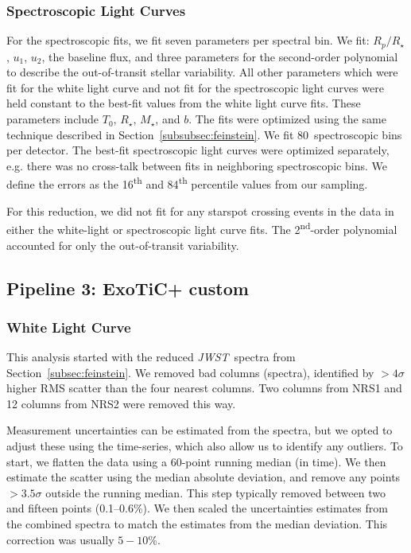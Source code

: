 \documentclass[twocolumn]{aastex63} %
\newcommand{\jwst}{\textit{JWST}}
\begin{document}
\subsubsection{Spectroscopic Light Curves}

For the spectroscopic fits, we fit seven parameters per spectral bin. We fit: $R_p/R_\star$, $u_1$, $u_2$, the baseline flux, and three parameters for the  second-order polynomial to describe the out-of-transit stellar variability. All other parameters which were fit for the white light curve and not fit for the spectroscopic light curves were held constant to the best-fit values from the white light curve fits. These parameters include $T_0$, $R_\star$, $M_\star$, and $b$. The fits were optimized using the same technique described in Section~\ref{subsubsec:feinstein}. We fit 80~spectroscopic bins per detector. The best-fit spectroscopic light curves were optimized separately, e.g. there was no cross-talk between fits in neighboring spectroscopic bins. We define the errors as the 16\textsuperscript{th} and 84\textsuperscript{th} percentile values from our sampling.

For this reduction, we did not fit for any starspot crossing events in the data in either the white-light or spectroscopic light curve fits. The 2\textsuperscript{nd}-order polynomial accounted for only the out-of-transit variability. 


\subsection{Pipeline 3: ExoTiC+ custom}\label{subsec:mann}

\subsubsection{White Light Curve}
This analysis started with the reduced \jwst\ spectra from Section~\ref{subsec:feinstein}. We removed bad columns (spectra), identified by $>4\sigma$ higher RMS scatter than the four nearest columns. Two columns from NRS1 and 12 columns from NRS2 were removed this way. 

Measurement uncertainties can be estimated from the spectra, but we opted to adjust these using the time-series, which also allow us to identify any outliers. To start, we flatten the data using a 60-point running median (in time). We then estimate the scatter using the median absolute deviation, and remove any points $>3.5\sigma$ outside the running median. This step typically removed between two and fifteen points (0.1--0.6\%). We then scaled the uncertainties estimates from the combined spectra to match the estimates from the median deviation. This correction was usually $5-10$\%.
\end{document}
